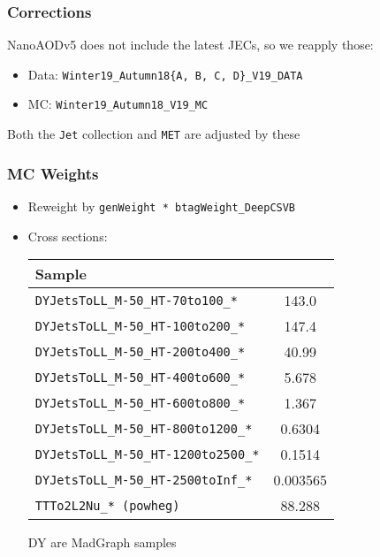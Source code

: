 \documentclass{beamer}
\begin{document}
\begin{frame}
  \frametitle{Corrections}

  NanoAODv5 does not include the latest JECs, so we reapply those:

  \begin{itemize}
  \item Data: \texttt{Winter19\_Autumn18\{A, B, C, D\}\_V19\_DATA}
  \item MC: \texttt{Winter19\_Autumn18\_V19\_MC}
  \end{itemize}

  Both the \texttt{Jet} collection and \texttt{MET} are adjusted by these

\end{frame}


\begin{frame}
  \frametitle{MC Weights}

  \begin{itemize}
  \item Reweight by \texttt{genWeight * btagWeight\_DeepCSVB}
  \item Cross sections:
    \vfill
    \begin{tabular}{|l|S|}
      \hline
      Sample &  \\
      \hline
      \texttt{DYJetsToLL\_M-50\_HT-70to100\_*} & 143.0 \\
      \texttt{DYJetsToLL\_M-50\_HT-100to200\_*} & 147.4 \\
      \texttt{DYJetsToLL\_M-50\_HT-200to400\_*} & 40.99 \\
      \texttt{DYJetsToLL\_M-50\_HT-400to600\_*} & 5.678 \\
      \texttt{DYJetsToLL\_M-50\_HT-600to800\_*} & 1.367 \\
      \texttt{DYJetsToLL\_M-50\_HT-800to1200\_*} & 0.6304 \\
      \texttt{DYJetsToLL\_M-50\_HT-1200to2500\_*} & 0.1514 \\
      \texttt{DYJetsToLL\_M-50\_HT-2500toInf\_*} & 0.003565 \\
      \texttt{TTTo2L2Nu\_* (powheg)} & 88.288 \\
      \hline
    \end{tabular}
    \vfill
    DY are MadGraph samples
  \end{itemize}

\end{frame}
\end{document}
